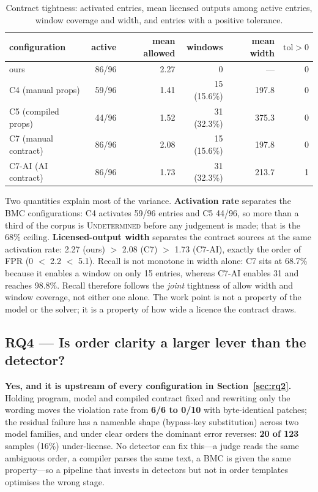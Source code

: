 \documentclass[acmsmall,screen,review,anonymous]{acmart}
\begin{document}
\begin{table}[htbp]
\centering
\small
\begin{tabular}{@{}l r r r r r@{}}
\toprule
configuration & active & mean allowed & windows & mean width & $\mathrm{tol}>0$ \\
\midrule
ours & 86/96 & 2.27 & 0 & --- & 0 \\
C4 (manual props) & 59/96 & 1.41 & 15 (15.6\%) & 197.8 & 0 \\
C5 (compiled props) & 44/96 & 1.52 & 31 (32.3\%) & 375.3 & 0 \\
C7 (manual contract) & 86/96 & 2.08 & 15 (15.6\%) & 197.8 & 0 \\
C7-AI (AI contract) & 86/96 & 1.73 & 31 (32.3\%) & 213.7 & 1 \\
\bottomrule
\end{tabular}
\caption{Contract tightness: activated entries, mean licensed outputs among active entries, window coverage and width, and entries with a positive tolerance.}
\label{tab:tight}
\end{table}

Two quantities explain most of the variance. \textbf{Activation rate} separates the BMC configurations: C4 activates 59/96 entries and C5 44/96, so more than a third of the corpus is \textsc{Undetermined} before any judgement is made; that is the 68\% ceiling. \textbf{Licensed-output width} separates the contract sources at the same activation rate: 2.27 (ours) $>$ 2.08 (C7) $>$ 1.73 (C7-AI), exactly the order of FPR (0 $<$ 2.2 $<$ 5.1). Recall is not monotone in width alone: C7 sits at 68.7\% because it enables a window on only 15 entries, whereas C7-AI enables 31 and reaches 98.8\%. Recall therefore follows the \emph{joint} tightness of allow width and window coverage, not either one alone. The work point is not a property of the model or the solver; it is a property of how wide a licence the contract draws.

\subsection{RQ4 --- Is order clarity a larger lever than the detector?}

\textbf{Yes, and it is upstream of every configuration in Section~\ref{sec:rq2}.} Holding program, model and compiled contract fixed and rewriting only the wording moves the violation rate from \textbf{6/6 to 0/10} with byte-identical patches; the residual failure has a nameable shape (bypass-key substitution) across two model families, and under clear orders the dominant error reverses: \textbf{20 of 123} samples (16\%) under-license. No detector can fix this---a judge reads the same ambiguous order, a compiler parses the same text, a BMC is given the same property---so a pipeline that invests in detectors but not in order templates optimises the wrong stage.
\end{document}
